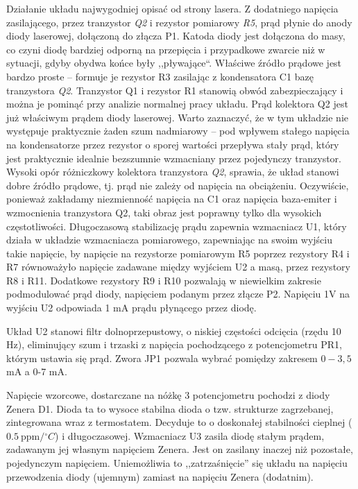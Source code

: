 \documentclass[a4paper,10pt]{article}
\begin{document}
Działanie układu najwygodniej opisać od strony lasera. Z dodatniego napięcia zasilającego, przez tranzystor \textit{Q2} i rezystor pomiarowy \textit{R5}, prąd płynie do anody diody laserowej, dołączoną do złącza P1. Katoda diody jest dołączona do masy, co czyni diodę bardziej odporną na przepięcia i przypadkowe zwarcie niż w sytuacji, gdyby obydwa końce były ,,pływające``.  
Właściwe źródło prądowe jest bardzo proste -- formuje je rezystor R3 zasilając z kondensatora C1 bazę tranzystora \textit{Q2}. Tranzystor Q1 i rezystor R1 stanowią obwód zabezpieczający i można je pominąć przy analizie normalnej pracy układu. Prąd kolektora Q2 jest już właściwym prądem diody laserowej. Warto zaznaczyć, że w tym układzie nie występuje praktycznie żaden szum nadmiarowy -- pod wpływem stałego napięcia na kondensatorze przez rezystor o sporej wartości przepływa stały prąd, który jest praktycznie idealnie bezszumnie wzmacniany przez pojedynczy tranzystor. Wysoki opór różniczkowy kolektora tranzystora \textit{Q2}, sprawia, że układ stanowi dobre źródło prądowe, tj. prąd nie zależy od napięcia na obciążeniu. Oczywiście, ponieważ zakładamy niezmienność napięcia na C1 oraz napięcia baza-emiter i wzmocnienia tranzystora Q2, taki obraz jest poprawny tylko dla wysokich częstotliwości. Długoczasową stabilizację prądu zapewnia wzmacniacz U1, który działa w układzie wzmacniacza pomiarowego, zapewniając na swoim wyjściu takie napięcie, by napięcie na rezystorze pomiarowym R5 poprzez rezystory R4 i R7 równoważyło napięcie zadawane między wyjściem U2 a masą, przez rezystory  R8 i R11.
Dodatkowe rezystory R9 i R10 pozwalają w niewielkim zakresie podmodulować prąd diody, napięciem podanym przez złącze P2.
Napięciu 1V na wyjściu U2 odpowiada 1 mA prądu płynącego przez diodę.

Układ U2 stanowi filtr dolnoprzepustowy, o niskiej częstości odcięcia (rzędu 10 Hz), eliminujący szum i trzaski z napięcia pochodzącego z potencjometru PR1, którym ustawia się prąd. Zwora JP1 pozwala wybrać pomiędzy zakresem $0-3{,}5$ mA a 0-7 mA.

Napięcie wzorcowe, dostarczane na nóżkę 3 potencjometru pochodzi z diody Zenera D1. Dioda ta to wysoce stabilna dioda o tzw. strukturze zagrzebanej, zintegrowana wraz z termostatem. Decyduje to o doskonałej stabilności cieplnej ($0.5~\mathrm{ppm}/{}^{\circ}C$) i długoczasowej.  Wzmacniacz U3 zasila diodę stałym prądem, zadawanym jej własnym napięciem Zenera. Jest on zasilany inaczej niż pozostałe, pojedynczym napięciem. Uniemożliwia to ,,zatrzaśnięcie'' się układu na napięciu przewodzenia diody (ujemnym) zamiast na napięciu Zenera (dodatnim). 
\end{document}
